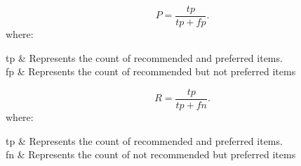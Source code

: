 \begin{equation}
\label{eqn:precision} P =    \frac{tp}{tp+fp} .  
\end{equation}
where:
    \begin{conditions}
     tp    &  Represents the count of recommended and preferred items.\\   
     fp & Represents the count of recommended but not preferred items \\ 
     \end{conditions}

\begin{equation}
\label{eqn:recall} R =    \frac{tp}{tp+fn} .  
\end{equation}
where:
    \begin{conditions}
     tp    &  Represents the count of recommended and preferred items.\\   
     fn & Represents the count of not recommended but preferred items \\ 
     \end{conditions}



